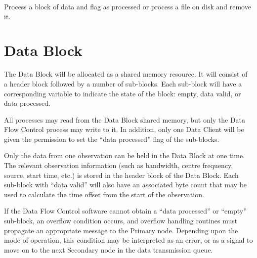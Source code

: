 Process a block of data and flag as processed or process a file on
disk and remove it.

\section{Data Block}
\label{sec:data_block}

The Data Block will be allocated as a shared memory resource.  It will
consist of a header block followed by a number of sub-blocks.  Each
sub-block will have a corresponding variable to indicate the state of
the block: empty, data valid, or data processed.

All processes may read from the Data Block shared memory, but only the
Data Flow Control process may write to it.  In addition, only one Data
Client will be given the permission to set the ``data processed'' flag
of the sub-blocks.

Only the data from one observation can be held in the Data Block at
one time.  The relevant observation information (such as bandwidth,
centre frequency, source, start time, etc.) is stored in the header
block of the Data Block.  Each sub-block with ``data valid'' will also
have an associated byte count that may be used to calculate the time
offset from the start of the observation.

If the Data Flow Control software cannot obtain a ``data processed''
or ``empty'' sub-block, an overflow condition occurs, and overflow
handling routines must propagate an appropriate message to the Primary
node.  Depending upon the mode of operation, this condition may be
interpreted as an error, or as a signal to move on to the next
Secondary node in the data transmission queue.
